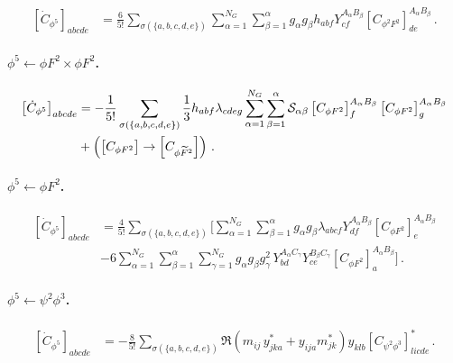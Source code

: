 \begin{align}
    \left[\dot C_{\phi^5}\right]_{abcde} &= \frac{6}{5!} \sum_{\sigma(\{a,b,c,d,e\})} \sum_{\alpha=1}^{N_G} \sum_{\beta=1}^{\alpha} g_\alpha g_\beta h_{abf} Y^{A_\alpha B_\beta}_{cf} \left[C_{\phi^2 F^2}\right]^{A_\alpha B_\beta}_{de}\,.
\end{align}

\paragraph{\texorpdfstring{$\phi^5\leftarrow \phi F^2\times\phi F^2$}{phi5fromphiF2xphiF2}.}
\label{par:phi5<-phiF2xphiF2}

\begin{align}
    \left[\dot C_{\phi^5}\right]_{abcde} &= -\frac{1}{5!} \sum_{\sigma(\{a,b,c,d,e\})} \frac{1}{3} h_{abf}\lambda_{cdeg} \sum_{\alpha=1}^{N_G}\sum_{\beta=1}^\alpha \mathcal{S}_{\alpha\beta} \left[C_{\phi F^2}\right]_{f}^{A_\alpha B_\beta} \left[C_{\phi F^2}\right]_{g}^{A_\alpha B_\beta}\nonumber \\
    &+\left(\left[C_{\phi F^2}\right]\to \left[C_{\phi \widetilde{F}^2}\right]\right)\,.
\end{align}

\paragraph{\texorpdfstring{$\phi^5\leftarrow \phi F^2$}{phi5fromphiF2}.}
\label{par:phi5<-phiF2}

\begin{align}
    \left[\dot C_{\phi^5}\right]_{abcde} &=
    \frac{4}{5!}\sum_{\sigma(\{a,b,c,d,e\})} \Bigg[\sum_{\alpha=1}^{N_G} \sum_{\beta=1}^{\alpha} g_\alpha g_\beta \lambda_{abcf} Y_{df}^{A_\alpha B_\beta} \left[C_{\phi F^2}\right]_{e}^{A_\alpha B_\beta}\nonumber\\
    &- 6 \sum_{\alpha=1}^{N_G}\sum_{\beta=1}^{\alpha}\sum_{\gamma=1}^{N_G} g_\alpha g_\beta g_\gamma^2 \,Y_{bd}^{A_\alpha C_\gamma} Y_{ce}^{B_\beta C_\gamma} \left[C_{\phi F^2}\right]_{a}^{A_\alpha B_\beta}\Bigg]\,.
    \label{eq:phi5<-phiF2}
\end{align}

\paragraph{\texorpdfstring{$\phi^5\leftarrow \psi^2\phi^3$}{phi5frompsi2phi3}.}

\begin{align}
    \left[\dot{C}_{\phi^5}\right]_{abcde} &= - \frac{8}{5!}\sum_{\sigma(\{a,b,c,d,e\})} \Re{\left(m_{ij}\, y_{jka}^*+y_{ija}m_{jk}^*\right) y_{klb}\left[C_{\psi^2\phi^3}\right]_{licde}^*}\,.\label{phi5_psi2phi3}
\end{align}


